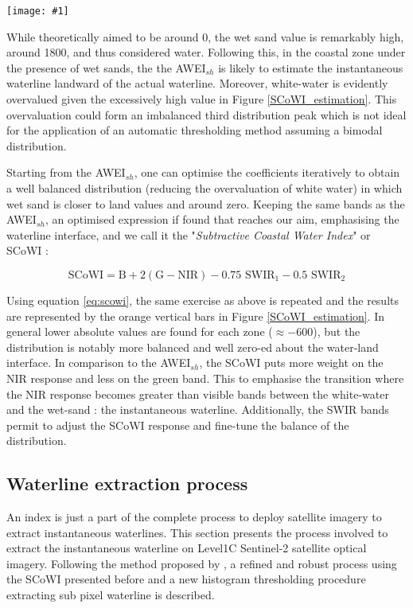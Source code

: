 \documentclass[remotesensing,article,submit,pdftex,moreauthors]{Definitions/mdpi}
\newcommand{\myfigure}[4]{
    \begin{figure*}[ht!]
        \centering
        \texttt{[image: \#1]}	 
        \caption{\itshape#2}
        \label{#3}
    \end{figure*} 
}
\begin{document}
\myfigure{img/SCoWI_optimisation.png}{Comparison of the estimated SCoWI values (orange bars) against the AWEI$_{sh}$ (blue bars) over the 5 areas of the intertidal zone. The SCoWI has lower estimated values than AWEI$_{sh}$ on the white-water and wet sand area, optimising the land/water classification on sandy beaches by setting its boundary on the waterline.}{SCoWI_estimation}{0.5}

While theoretically aimed to be around 0, the wet sand value is remarkably high, around 1800, and thus considered water. Following this, in the coastal zone under the presence of wet sands, the the AWEI$_{sh}$ is likely to estimate the instantaneous waterline landward of the actual waterline. Moreover, white-water is evidently overvalued given the excessively high value in Figure \ref{SCoWI_estimation}. This overvaluation could form an imbalanced third distribution peak which is not ideal for the application of an automatic thresholding method assuming a bimodal distribution.

Starting from the AWEI$_{sh}$, one can optimise the coefficients iteratively to obtain a well balanced distribution (reducing the overvaluation of white water) in which wet sand is closer to land values and around zero. Keeping the same bands as the AWEI$_{sh}$, an optimised expression if found that reaches our aim, emphasising the waterline interface, and we call it the "\textit{Subtractive Coastal Water Index}" or SCoWI : 

\begin{equation}
    \textrm{SCoWI} = \textrm{B} + 2(\textrm{G} - \textrm{NIR}) - 0.75 \textrm{ SWIR$_{1}$} - 0.5 \textrm{ SWIR$_{2}$}
    \label{eq:scowi}
\end{equation}

Using equation \ref{eq:scowi}, the same exercise as above is repeated and the results are represented by the orange vertical bars in Figure \ref{SCoWI_estimation}. In general lower absolute values are found for each zone ($\approx -600$), but the distribution is notably more balanced and well zero-ed about the water-land interface. In comparison to the AWEI$_{sh}$, the SCoWI puts more weight on the NIR response and less on the green band. This to emphasise the transition where the NIR response becomes greater than visible bands between the white-water and the wet-sand : the instantaneous waterline. Additionally, the SWIR bands permit to adjust the SCoWI response and fine-tune the balance of the distribution.
        
\subsection{Waterline extraction process}\label{extract_process}
An index is just a part of the complete process to deploy satellite imagery to extract instantaneous waterlines. This section presents the process involved to extract the instantaneous waterline on Level1C Sentinel-2 satellite optical imagery. Following the method proposed by \citep{Bishop_sub_pixel}, a refined and robust process using the SCoWI presented before and a new histogram thresholding procedure extracting sub pixel waterline is described.
\end{document}
